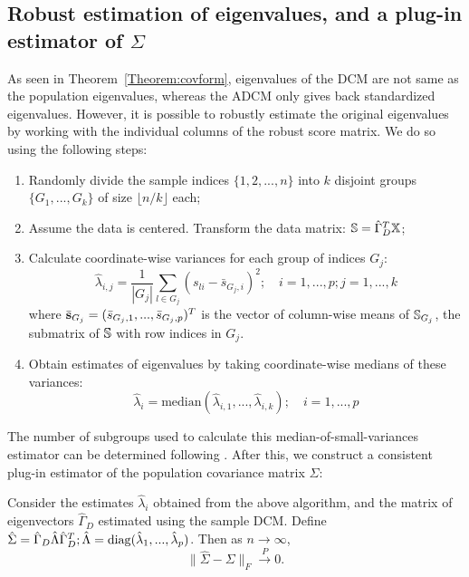 \subsection{Robust estimation of eigenvalues, and a plug-in estimator of $\Sigma$}
\label{subsec:plugin}
As seen in Theorem~\ref{Theorem:covform}, eigenvalues of the DCM are not same as the population eigenvalues, whereas the ADCM only gives back standardized eigenvalues. However, it is possible to robustly estimate the original eigenvalues by working with the individual columns of the robust score matrix. We do so using the following steps:

\begin{enumerate}
\item Randomly divide the sample indices $\{1,2,...,n\}$ into $k$ disjoint groups $\{G_1,...,G_k \}$ of size $\lfloor n/k \rfloor$ each;

\item Assume the data is centered. Transform the data matrix: ${\mathbb{S}} = \hat\Gamma^T_D {\mathbb{X}}$;

\item Calculate coordinate-wise variances for each group of indices $G_j$:
%
$$
\hat\lambda_{i,j} = \frac{1}{|G_j|} \sum_{l \in G_j} (s_{li} - \bar s_{G_j,i})^2; \quad i = 1,...,p; j = 1,...,k
$$
where $\bar{{\bf{s}}}_{G_j} = (\bar s_{G_j,1}, ..., \bar s_{G_j,p})^T$ is the vector of column-wise means of ${\mathbb{S}}_{G_j}$, the submatrix of ${\mathbb{S}}$ with row indices in $G_j$.
%
\item Obtain estimates of eigenvalues by taking coordinate-wise medians of these variances:
%
$$
\hat \lambda_i = \text{median} (\hat\lambda_{i,1}, ... , \hat\lambda_{i,k} ); \quad i = 1,...,p
$$
%
\end{enumerate}
%
The number of subgroups used to calculate this median-of-small-variances estimator can be determined following \cite{Minsker15}. After this, we construct a consistent plug-in estimator of the population covariance matrix $\Sigma$:

\begin{Theorem}\label{Thm:pluginSigma}
Consider the estimates $\hat\lambda_i$ obtained from the above algorithm, and the matrix of eigenvectors $\hat\Gamma_D$ estimated using the sample DCM. Define $\hat\Sigma = \hat\Gamma_D \hat\Lambda \hat\Gamma_D^T; \hat\Lambda = \operatorname*{diag}(\hat\lambda_1, ..., \hat\lambda_p)$. Then as $n \rightarrow \infty$,
%
$$
\| \hat\Sigma - \Sigma \|_F \stackrel{P}{\rightarrow} 0.
$$
%
\end{Theorem}

